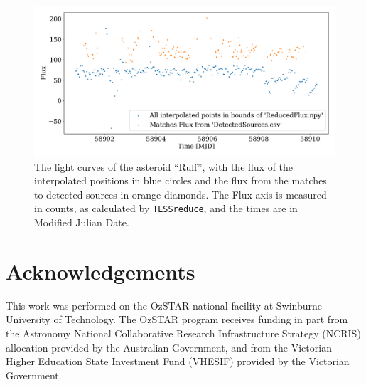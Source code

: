 \documentclass[12pt]{article}
\begin{document}
\begin{figure}
  \centering
  \includegraphics[width =\columnwidth]{../Test Code/Testing Figures/differentFluxes Ruff .pdf}
  \caption[Light curves of Ruff]{The light curves of the asteroid ``Ruff'', with the flux of the interpolated positions in blue circles and the flux from the matches to detected sources in orange diamonds.
  The Flux axis is measured in counts, as calculated by \texttt{TESSreduce}, and the times are in Modified Julian Date.}
  \label{Fig:DifFlux}
\end{figure}
    

\newpage %

\section*{Acknowledgements}
\small
This work was performed on the OzSTAR national facility at Swinburne University of Technology. 
The OzSTAR program receives funding in part from the Astronomy National Collaborative Research Infrastructure Strategy (NCRIS) allocation provided by the Australian Government, and from the Victorian Higher Education State Investment Fund (VHESIF) provided by the Victorian Government.




\end{document}
